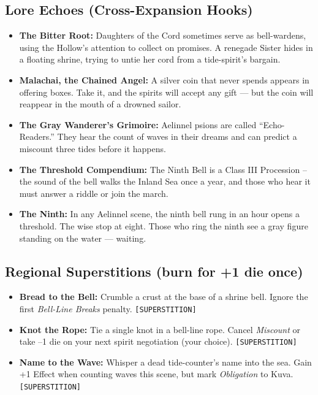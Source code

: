 \subsection*{Lore Echoes (Cross-Expansion Hooks)}
\begin{itemize}
  \item \textbf{The Bitter Root:} Daughters of the Cord sometimes serve as bell-wardens, using the Hollow's attention to collect on promises. A renegade Sister hides in a floating shrine, trying to untie her cord from a tide-spirit's bargain.
  \item \textbf{Malachai, the Chained Angel:} A silver coin that never spends appears in offering boxes. Take it, and the spirits will accept any gift --- but the coin will reappear in the mouth of a drowned sailor.
  \item \textbf{The Gray Wanderer's Grimoire:} Aelinnel psions are called ``Echo-Readers.'' They hear the count of waves in their dreams and can predict a miscount three tides before it happens.
  \item \textbf{The Threshold Compendium:} The Ninth Bell is a Class III Procession -- the sound of the bell walks the Inland Sea once a year, and those who hear it must answer a riddle or join the march.
  \item \textbf{The Ninth:} In any Aelinnel scene, the ninth bell rung in an hour opens a threshold. The wise stop at eight. Those who ring the ninth see a gray figure standing on the water --- waiting.
\end{itemize}

\subsection*{Regional Superstitions (burn for +1 die once)}
\begin{itemize}
  \item \textbf{Bread to the Bell:} Crumble a crust at the base of a shrine bell. Ignore the first \emph{Bell-Line Breaks} penalty. \texttt{[SUPERSTITION]}
  \item \textbf{Knot the Rope:} Tie a single knot in a bell-line rope. Cancel \emph{Miscount} or take --1 die on your next spirit negotiation (your choice). \texttt{[SUPERSTITION]}
  \item \textbf{Name to the Wave:} Whisper a dead tide-counter's name into the sea. Gain +1 Effect when counting waves this scene, but mark \emph{Obligation} to Kuva. \texttt{[SUPERSTITION]}
\end{itemize}

